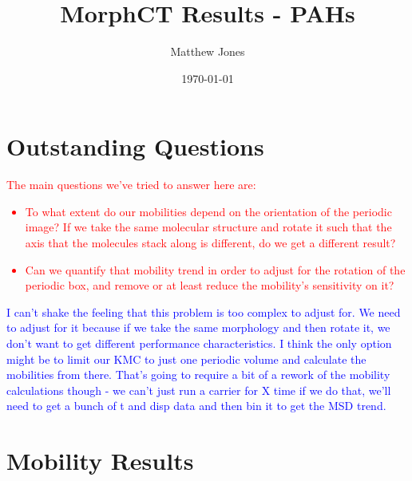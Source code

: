 \documentclass[12pt]{article}
\title{MorphCT Results - PAHs}
\author{Matthew Jones}
\date{\today}
\begin{document}
\maketitle

\section{Outstanding Questions}

\textcolor{red}{The main questions we've tried to answer here are:
    \begin{itemize}
        \item{To what extent do our mobilities depend on the orientation of the periodic image? If we take the same molecular structure and rotate it such that the axis that the molecules stack along is different, do we get a different result?}
        \item{Can we quantify that mobility trend in order to adjust for the rotation of the periodic box, and remove or at least reduce the mobility's sensitivity on it?}
    \end{itemize}
}

\textcolor{blue}{I can't shake the feeling that this problem is too complex to adjust for.
    We need to adjust for it because if we take the same morphology and then rotate it, we don't want to get different performance characteristics.
    I think the only option might be to limit our KMC to just one periodic volume and calculate the mobilities from there.
    That's going to require a bit of a rework of the mobility calculations though - we can't just run a carrier for X time if we do that, we'll need to get a bunch of t and disp data and then bin it to get the MSD trend.}

\clearpage

\section{Mobility Results}
\end{document}
